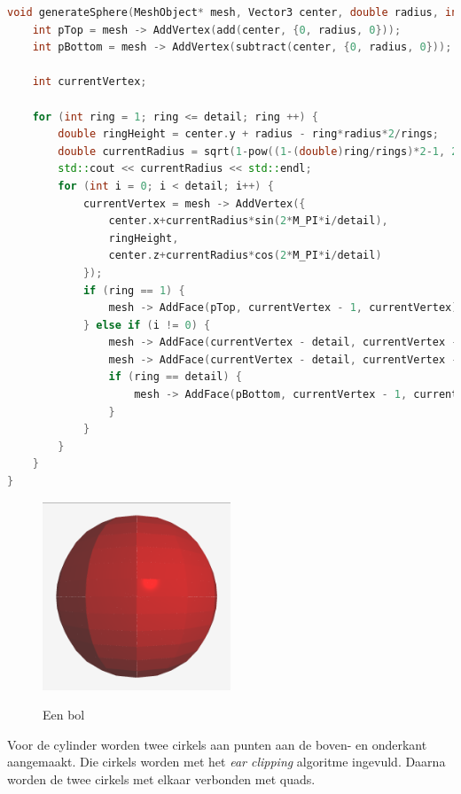 \documentclass[12pt, a4paper]{article}
\begin{document}
\begin{lstlisting}[language=c++]
void generateSphere(MeshObject* mesh, Vector3 center, double radius, int rings, int detail) {
	int pTop = mesh -> AddVertex(add(center, {0, radius, 0}));
	int pBottom = mesh -> AddVertex(subtract(center, {0, radius, 0}));
	
	int currentVertex;
	
	for (int ring = 1; ring <= detail; ring ++) {
		double ringHeight = center.y + radius - ring*radius*2/rings;
		double currentRadius = sqrt(1-pow((1-(double)ring/rings)*2-1, 2))*radius;
		std::cout << currentRadius << std::endl;
		for (int i = 0; i < detail; i++) {
			currentVertex = mesh -> AddVertex({
				center.x+currentRadius*sin(2*M_PI*i/detail),
				ringHeight,
				center.z+currentRadius*cos(2*M_PI*i/detail)
			});
			if (ring == 1) {
				mesh -> AddFace(pTop, currentVertex - 1, currentVertex);
			} else if (i != 0) {
				mesh -> AddFace(currentVertex - detail, currentVertex - 1, currentVertex);
				mesh -> AddFace(currentVertex - detail, currentVertex - detail - 1, currentVertex - 1);
				if (ring == detail) {
					mesh -> AddFace(pBottom, currentVertex - 1, currentVertex);
				}
			}
		}
	}
}
\end{lstlisting}

\begin{figure}[H]
	\centering
	\includegraphics[width=0.50\textwidth]{renders/test_001_mesh_highres.png}
	\label{fig:sphere_mesh}
	\caption{Een bol}
\end{figure}

Voor de cylinder worden twee cirkels aan punten aan de boven- en onderkant aangemaakt. Die cirkels worden met het \textit{ear clipping} algoritme ingevuld\cite{10.2307/2319703}. Daarna worden de twee cirkels met elkaar verbonden met quads.
\end{document}
